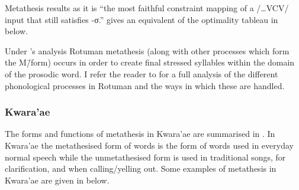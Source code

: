 Metathesis results as it is ``the most faithful constraint mapping of a
/{\ldots}VCV/ input that still satisfies -σ.''
\citet[174]{mcc00} gives an equivalent of the optimality tableau in  below.

\begin{exe}
\label{ex:RotOT}
\end{exe}

Under \citeauthor{mcc00}'s analysis Rotuman metathesis
(along with other processes which form the M\=/form)
occurs in order to create final stressed syllables
within the domain of the prosodic word.
I refer the reader to \cite{mcc00} for a full analysis
of the different phonological processes in Rotuman
and the ways in which these are handled.

\subsubsection{Kwara'ae}\label{sec:ProMorKwa}
The forms and functions of metathesis in Kwara'ae are summarised in .
In Kwara'ae the metathesised form of words is the form of words used in everyday normal speech
while the unmetathesised form is used in traditional songs,
for clarification, and when calling/yelling out.
Some examples of metathesis in Kwara'ae
are given in  below.

\begin{exe}
	\label{ex2:KwVCV->VVC}
\end{exe}

